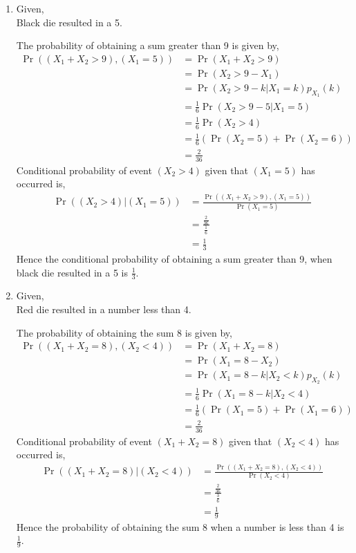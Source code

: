 \documentclass[10pt,column]{article}
\providecommand{\pr}[1]{\ensuremath{\Pr\left(#1\right)}}
\providecommand{\brak}[1]{\ensuremath{\left(#1\right)}}
\begin{document}
\begin{enumerate}
\item 
Given, \\
Black die resulted in a 5. 

The probability of obtaining a sum greater than 9 is given by,
\begin{align}
\Pr\brak{\brak{X_1 + X_2 > 9}, \brak{X_1 = 5}}
&= \pr{X_1 + X_2  > 9} \\
&= \pr{X_2  > 9 -X_1} \\
&= \pr{X_2  > 9 -k | X_1 = k}p_{X_1}(k) \\
&= \frac{1}{6} \pr{X_2  > 9 -5 | X_1 = 5} \\
&= \frac{1}{6} \pr{X_2 > 4} \\
&= \frac{1}{6} (\pr{X_2 = 5} + \pr{X_2 = 6}) \\
&= \frac{2}{36}
\end{align}
Conditional probability of event $(X_2 > 4)$ given that $(X_1 = 5)$ has occurred is, 
\begin{align}
\Pr{\brak{\brak{X_2 > 4}|\brak{X_1=5}}}
&=\frac{\Pr{((X_1 + X_2 > 9),(X_1=5))}}{\Pr{\brak{X_1=5}}}\\
&=\frac{\frac{2}{36}}{\frac{1}{6}}\\
&=\frac{1}{3}
\end{align}  
Hence the conditional probability of obtaining a sum greater than 9, when black die resulted in a 5 is $\frac{1}{3}$. 

\item Given, \\
Red die resulted in a number less than 4. 

The probability of obtaining the sum 8 is given by,
\begin{align}
\Pr{\brak{\brak{X_1 + X_2 = 8},\brak{X_2<4}}} 
&= \pr{X_1 + X_2 = 8} \\
&= \pr{X_1  = 8 -X_2} \\
&= \pr{X_1  = 8 -k | X_2 < k}p_{X_2}(k) \\
&= \frac{1}{6} \pr{X_1  = 8 -k | X_2 < 4} \\
&= \frac{1}{6} (\pr{X_1 = 5} + \pr{X_1 = 6}) \\
&= \frac{2}{36}
\end{align}
Conditional probability of event $(X_1 + X_2 = 8)$ given that $(X_2 < 4)$ has occurred is, 
\begin{align}
\Pr{\brak{\brak{X_1 + X_2 = 8}|\brak{X_2<4}}} 
&= \frac{\Pr{((X_1 + X_2 = 8),(X_2 < 4))}}{\Pr{\brak{X_2 < 4}}} \\
&= \frac{\frac{2}{36}}{\frac{3}{6}}\\
&= \frac{1}{9}
\end{align} 
Hence the probability of obtaining the sum 8 when a number is less than 4 is $\frac{1}{9}$. 
\end{enumerate}
\end{document}
